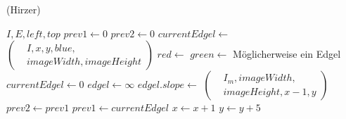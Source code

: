 \begin{algorithm}[!ht]
\caption{ (Hirzer)}
\label{alg:findedgelshirzer-1}
	\begin{algorithmic}[1]
		\Require $I, E,\mathit{left},\mathit{top}$
			\State $\mathit{prev1} \gets 0$
			\State $\mathit{prev2} \gets 0$
				\State $\mathit{currentEdgel} \gets$ 
				$\left(
				\begin{aligned}
					& I,x,y,\mathit{blue},\\
					& \mathit{imageWidth},\mathit{imageHeight}
				\end{aligned}\right)$
				\label{alg:findedgelshirzer-1-color-start}
				\State $\mathit{red} \gets$ 
				\State $\mathit{green} \gets$ 
				\label{alg:findedgelshirzer-1-color-end}
					\State Möglicherweise ein Edgel
				\Else
					\State $\mathit{currentEdgel} \gets 0$
				\EndIf
					\State $\mathit{edgel} \gets \infty$
					\State {}
					\State $\mathit{edgel.slope} \gets$ 
					$\left(
					\begin{aligned}
						& I_m, \mathit{imageWidth},\\
						& \mathit{imageHeight}, x - 1,y
					\end{aligned}\right)$
					\State {}
				\EndIf
				\State $\mathit{prev2} \gets \mathit{prev1}$
				\State $\mathit{prev1} \gets \mathit{currentEdgel}$
				\State $x \gets x + 1$
			\EndFor
			\State $y \gets y + 5$
		\EndFor
	\end{algorithmic}
\end{algorithm}
